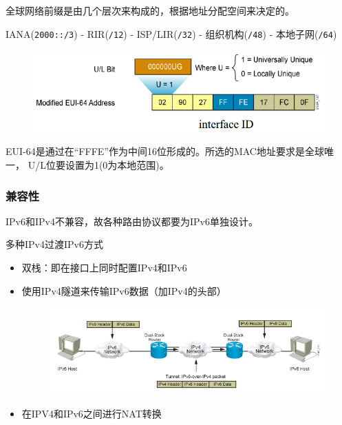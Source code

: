 全球网络前缀是由几个层次来构成的，根据地址分配空间来决定的。
\begin{center}
IANA(\verb'2000::/3') - RIR(\verb'/12') - ISP/LIR(\verb'/32') - 组织机构(\verb'/48') - 本地子网(\verb'/64')
\end{center}

\begin{figure}[H]
	\centering
	\includegraphics[width=0.8\linewidth]{fig/EUI-64.png}
\end{figure}
EUI-64是通过在“FFFE”作为中间16位形成的。所选的MAC地址要求是全球唯一， U/L位要设置为1(0为本地范围)。

\subsubsection{兼容性}
IPv6和IPv4不兼容，故各种路由协议都要为IPv6单独设计。

多种IPv4过渡IPv6方式
\begin{itemize}
\item 双栈：即在接口上同时配置IPv4和IPv6
\item 使用IPv4隧道来传输IPv6数据（加IPv4的头部）
\begin{figure}[H]
	\centering
	\includegraphics[width=0.8\linewidth]{fig/v4-to-v6.png}
\end{figure}
\item 在IPV4和IPv6之间进行NAT转换
\end{itemize}

